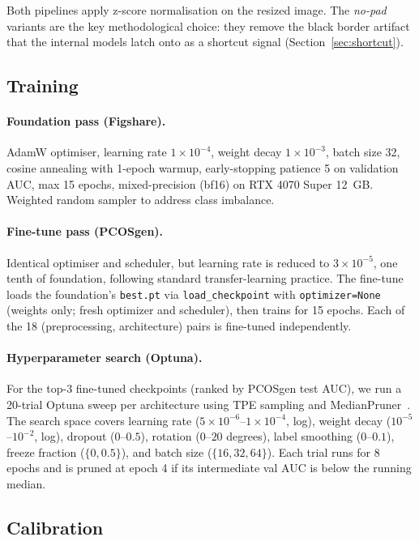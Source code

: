 \documentclass[11pt,twocolumn]{article}
\newcommand{\PCOS}{PCOS}
\newcommand{\AUC}{AUC}
\begin{document}
Both pipelines apply z-score normalisation on the resized image. The
\emph{no-pad} variants are the key methodological choice: they remove the
black border artifact that the internal models latch onto as a shortcut
signal (Section~\ref{sec:shortcut}).

\subsection{Training}

\paragraph{Foundation pass (Figshare).}
AdamW optimiser, learning rate $1{\times}10^{-4}$, weight decay
$1{\times}10^{-3}$, batch size 32, cosine annealing with 1-epoch warmup,
early-stopping patience 5 on validation \AUC{}, max 15 epochs,
mixed-precision (bf16) on RTX 4070 Super 12~GB. Weighted random sampler to
address class imbalance.

\paragraph{Fine-tune pass (\PCOS{}gen).}
Identical optimiser and scheduler, but learning rate is reduced to
$3{\times}10^{-5}$, one tenth of foundation, following standard
transfer-learning practice. The fine-tune loads the foundation's
\texttt{best.pt} via \texttt{load\_checkpoint} with \texttt{optimizer=None}
(weights only; fresh optimizer and scheduler), then trains for 15 epochs.
Each of the 18 (preprocessing, architecture) pairs is fine-tuned
independently.

\paragraph{Hyperparameter search (Optuna).}
For the top-3 fine-tuned checkpoints (ranked by \PCOS{}gen test \AUC{}),
we run a 20-trial Optuna sweep per architecture using TPE sampling and
MedianPruner~\cite{akiba2019}. The search space covers learning rate
($5{\times}10^{-6}$--$1{\times}10^{-4}$, log), weight decay
($10^{-5}$--$10^{-2}$, log), dropout ($0$--$0.5$), rotation
($0$--$20$ degrees), label smoothing ($0$--$0.1$), freeze fraction
($\{0, 0.5\}$), and batch size ($\{16, 32, 64\}$). Each trial runs for 8
epochs and is pruned at epoch 4 if its intermediate val \AUC{} is below
the running median.

\subsection{Calibration}
\end{document}
